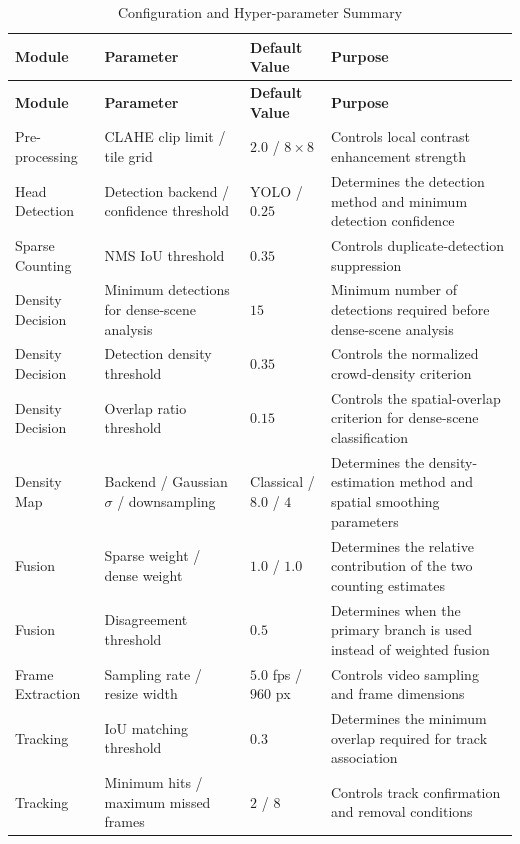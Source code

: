 \documentclass[12pt,a4paper]{report}
\begin{document}
\begin{longtable}{|p{}|p{}|
p{}|p{}|}
\caption{Configuration and Hyper-parameter Summary}
\label{tab:hyperparameters}\\
\hline
\textbf{Module} &
\textbf{Parameter} &
\textbf{Default Value} &
\textbf{Purpose} \\
\hline
\endfirsthead

\hline
\textbf{Module} &
\textbf{Parameter} &
\textbf{Default Value} &
\textbf{Purpose} \\
\hline
\endhead

Pre-processing &
CLAHE clip limit / tile grid &
$2.0$ / $8\times8$ &
Controls local contrast enhancement strength \\
\hline

Head Detection &
Detection backend / confidence threshold &
YOLO / $0.25$ &
Determines the detection method and minimum detection confidence \\
\hline

Sparse Counting &
NMS IoU threshold &
$0.35$ &
Controls duplicate-detection suppression \\
\hline

Density Decision &
Minimum detections for dense-scene analysis &
$15$ &
Minimum number of detections required before dense-scene analysis \\
\hline

Density Decision &
Detection density threshold &
$0.35$ &
Controls the normalized crowd-density criterion \\
\hline

Density Decision &
Overlap ratio threshold &
$0.15$ &
Controls the spatial-overlap criterion for dense-scene classification \\
\hline

Density Map &
Backend / Gaussian $\sigma$ / downsampling &
Classical / $8.0$ / $4$ &
Determines the density-estimation method and spatial smoothing parameters \\
\hline

Fusion &
Sparse weight / dense weight &
$1.0$ / $1.0$ &
Determines the relative contribution of the two counting estimates \\
\hline

Fusion &
Disagreement threshold &
$0.5$ &
Determines when the primary branch is used instead of weighted fusion \\
\hline

Frame Extraction &
Sampling rate / resize width &
$5.0$ fps / $960$ px &
Controls video sampling and frame dimensions \\
\hline

Tracking &
IoU matching threshold &
$0.3$ &
Determines the minimum overlap required for track association \\
\hline

Tracking &
Minimum hits / maximum missed frames &
$2$ / $8$ &
Controls track confirmation and removal conditions \\
\hline

\end{longtable}
\end{document}
